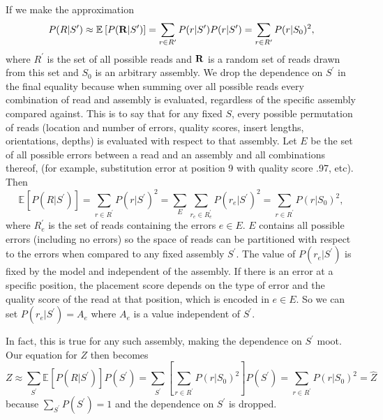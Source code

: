 \documentclass[phd,tocprelim]{cornell}
\begin{document}
If we make the approximation
\begin{equation}
    P(R|S^{\prime}) \approx \mathbb{E}_{}\left[P({\bf R}|S^{\prime})\right] = \sum_{r \in R^{\prime}} P(r|S^{\prime})P(r|S^{\prime}) = \sum_{r \in R^{\prime}} P(r|S_{0})^{2},
\end{equation}
where $R^{\prime}$ is the set of all possible reads and ${\bf R}$ is a random set of reads drawn from this set and $S_{0}$ is an arbitrary assembly. We drop the dependence on $S^{\prime}$ in the final equality because when summing over all possible reads every combination of read and assembly is evaluated, regardless of the specific assembly compared against. This is to say that for any fixed $S$, every possible permutation of reads (location and number of errors, quality scores, insert lengths, orientations, depths) is evaluated with respect to that assembly. Let $E$ be the set of all possible errors between a read and an assembly and all combinations thereof, (for example, substitution error at position 9 with quality score .97, etc). Then
\begin{equation}
    \mathbb{E}_{}\left[P(R|S^{\prime})\right] = \sum_{r \in R^{\prime}} P(r|S^{\prime})^{2} = \sum_{E} \sum_{r_{e} \in R_{e}^{\prime}} P(r_{e}|S^{\prime})^{2} = \sum_{r \in R^{\prime}} P(r|S_{0})^{2},
\end{equation}
where $R_{e}^{\prime}$ is the set of reads containing the errors $e \in E$. $E$ contains all possible errors (including no errors) so the space of reads can be partitioned with respect to the errors when compared to any fixed assembly $S^{\prime}$. The value of $P(r_{e}|S^{\prime})$ is fixed by the model and independent of the assembly. If there is an error at a specific position, the placement score depends on the type of error and the quality score of the read at that position, which is encoded in $e \in E$. So we can set $P(r_{e}|S^{\prime}) = A_{e}$ where $A_{e}$ is a value independent of $S^{\prime}$.

In fact, this is true for any such assembly, making the dependence on $S^{\prime}$ moot. Our equation for $Z$ then becomes
\begin{equation}
    Z \approx \sum_{S^{\prime}} \mathbb{E}_{}\left[P(R|S^{\prime})\right] P(S^{\prime}) = \sum_{S^{\prime}} \left[\sum_{r \in R^{\prime}} P(r|S_{0})^{2}\right] P(S^{\prime}) = \sum_{r \in R^{\prime}} P(r|S_{0})^{2} = \hat{Z}
\end{equation}
because $\sum_{S^{\prime}}P(S^{\prime}) = 1$ and the dependence on $S^{\prime}$ is dropped.
\end{document}
